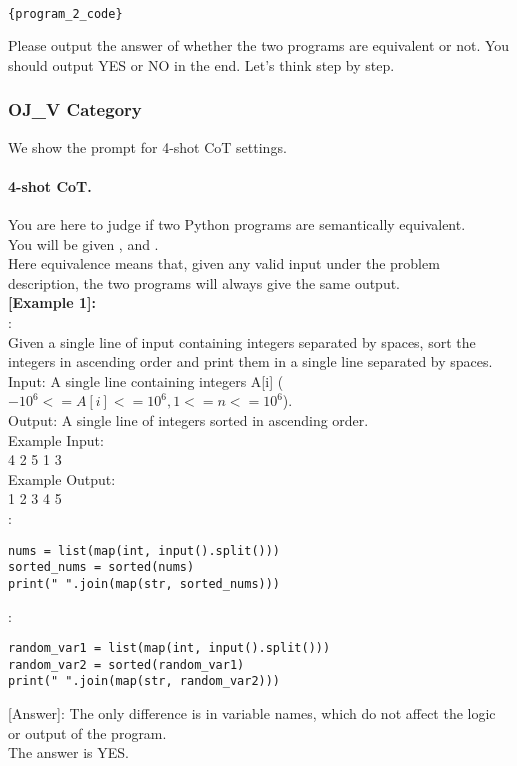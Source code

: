 \text{[Program 2]:}\\
\begin{lstlisting}
{program_2_code}
\end{lstlisting}

Please output the answer of whether the two programs are equivalent or not. You should output YES or NO in the end. Let's think step by step.


\subsubsection{OJ\_V Category}
We show the prompt for 4-shot CoT settings.

\paragraph{4-shot CoT.} You are here to judge if two Python programs are semantically equivalent.\\
You will be given , \text{[Program 1]} and \text{[Program 2]}.\\
Here equivalence means that, given any valid input under the problem description, the two programs will always give the same output.\\

\noindent\textbf{[Example 1]:}\\
:\\
Given a single line of input containing integers separated by spaces, sort the integers in ascending order and print them in a single line separated by spaces.\\
Input: A single line containing integers A[i] ($-10^6 <= A[i] <= 10^6, 1 <= n <= 10^6$).\\
Output: A single line of integers sorted in ascending order.\\
Example Input:\\
4 2 5 1 3\\
Example Output:\\
1 2 3 4 5
\\
\text{    [Program 1]}:\\
\begin{lstlisting}
nums = list(map(int, input().split()))
sorted_nums = sorted(nums)
print(" ".join(map(str, sorted_nums)))
\end{lstlisting}
\text{    [Program 2]}:\\
\begin{lstlisting}
random_var1 = list(map(int, input().split()))
random_var2 = sorted(random_var1)
print(" ".join(map(str, random_var2)))
\end{lstlisting}
[Answer]: The only difference is in variable names, which do not affect the logic or output of the program.\\
The answer is YES.\\

